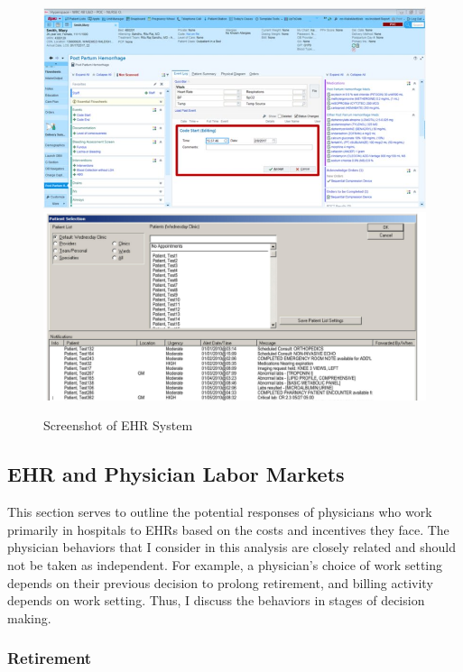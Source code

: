 \documentclass[12pt]{article}
\begin{document}
\begin{figure}[ht]
    \centering
    \captionsetup{width=.4\linewidth}
    \caption{Screenshot of EHR System}
    \includegraphics[scale=.4]{Objects/epic-ehr-screenshot.jpg}
    \includegraphics[scale=.11]{Objects/EHRimage2.jpg}
    \label{fig:EPIC}
\end{figure}


\subsection{EHR and Physician Labor Markets}

This section serves to outline the potential responses of physicians who work primarily in hospitals to EHRs based on the costs and incentives they face. The physician behaviors that I consider in this analysis are closely related and should not be taken as independent. For example, a physician's choice of work setting depends on their previous decision to prolong retirement, and billing activity depends on work setting. Thus, I discuss the behaviors in stages of decision making. 

\subsubsection{Retirement}
\end{document}
